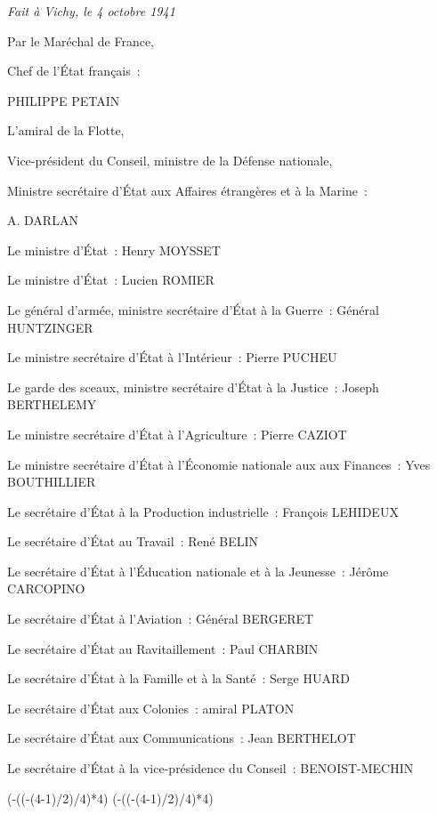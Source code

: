 \documentclass[french,twoside]{book} %
\def\truncdiv#1#2{((#1-(#2-1)/2)/#2)}
\def\moduloop#1#2{(#1-\truncdiv{#1}{#2}*#2)}
\def\modulo#1#2{\number\numexpr\moduloop{#1}{#2}\relax}
\begin{document}
\emph{Fait à Vichy, le 4 octobre 1941}\par
Par le Maréchal de France,\par
Chef de l’État français :\par
PHILIPPE PETAIN\par
L’amiral de la Flotte,\par
Vice-président du Conseil, ministre de la Défense nationale,\par
Ministre secrétaire d’État aux Affaires étrangères et à la Marine :\par
A. DARLAN\par
Le ministre d’État : Henry MOYSSET\par
Le ministre d’État : Lucien ROMIER\par
Le général d’armée, ministre secrétaire d’État à la Guerre : Général HUNTZINGER\par
Le ministre secrétaire d’État à l’Intérieur : Pierre PUCHEU\par
Le garde des sceaux, ministre secrétaire d’État à la Justice : Joseph BERTHELEMY\par
Le ministre secrétaire d’État à l’Agriculture : Pierre CAZIOT\par
Le ministre secrétaire d’État à l’Économie nationale aux aux Finances : Yves BOUTHILLIER\par
Le secrétaire d’État à la Production industrielle : François LEHIDEUX\par
Le secrétaire d’État au Travail : René BELIN\par
Le secrétaire d’État à l’Éducation nationale et à la Jeunesse : Jérôme CARCOPINO\par
Le secrétaire d’État à l’Aviation : Général BERGERET\par
Le secrétaire d’État au Ravitaillement : Paul CHARBIN\par
Le secrétaire d’État à la Famille et à la Santé : Serge HUARD\par
Le secrétaire d’État aux Colonies : amiral PLATON\par
Le secrétaire d’État aux Communications : Jean BERTHELOT\par
Le secrétaire d’État à la vice-présidence du Conseil : BENOIST-MECHIN
 


\ifbooklet
  \pagestyle{empty}
  \clearpage
  \ifnum\modulo{\value{page}}{4}=0 \hbox{}\newpage\hbox{}\newpage\fi
  \ifnum\modulo{\value{page}}{4}=1 \hbox{}\newpage\hbox{}\newpage\fi
\end{document}
